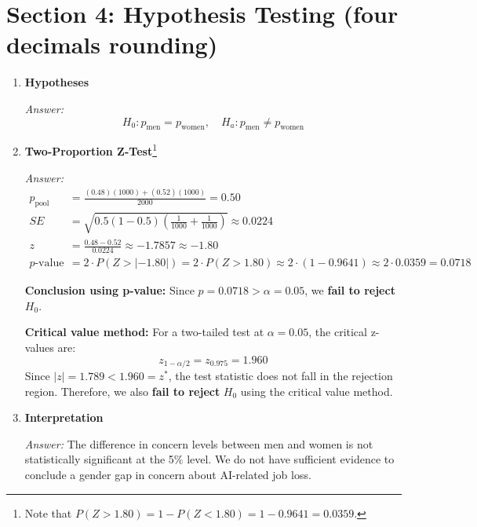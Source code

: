 \documentclass[12pt]{article}
\begin{document}
\section*{Section 4: Hypothesis Testing (four decimals rounding)}

\begin{enumerate}[label=4.\arabic*]
    \item \textbf{Hypotheses}

    \textit{Answer:}
\[
    H_0: p_{\text{men}} = p_{\text{women}}, \quad H_a: p_{\text{men}} \neq p_{\text{women}}
\]

    \item \textbf{Two-Proportion Z-Test}\text{ }\footnote{Note that $P(Z > 1.80) = 1 - P(Z < 1.80) = 1-0.9641 = 0.0359$.}

    \textit{Answer:}
    \begin{align*}
    p_{\text{pool}} &= \frac{(0.48)(1000) + (0.52)(1000)}{2000} = 0.50 \\
    SE &= \sqrt{0.5(1-0.5)\left(\frac{1}{1000} + \frac{1}{1000}\right)} \approx 0.0224 \\
    z &= \frac{0.48 - 0.52}{0.0224} \approx \boxed{-1.7857}  \approx - 1.80 \\
    p\text{-value} &= 2 \cdot P(Z > |- 1.80|) = 2 \cdot P(Z > 1.80) \approx 2\cdot (1-0.9641) \approx  2 \cdot 0.0359 = \boxed{0.0718}
    \end{align*}

    \textbf{Conclusion using p-value:} Since $p = 0.0718 > \alpha = 0.05$, we \textbf{fail to reject} $H_0$.

    \textbf{Critical value method:} For a two-tailed test at $\alpha = 0.05$, the critical z-values are:
\[
    z_{1-\alpha/2} = z_{0.975} = \boxed{1.960}
\]
    Since $\left| z \right| = 1.789 < 1.960=z^*$, the test statistic does not fall in the rejection region. Therefore, we also \textbf{fail to reject} $H_0$ using the critical value method.

    \item \textbf{Interpretation}

    \textit{Answer:} The difference in concern levels between men and women is not statistically significant at the 5\% level. We do not have sufficient evidence to conclude a gender gap in concern about AI-related job loss.
\end{enumerate}



\newpage
\end{document}
